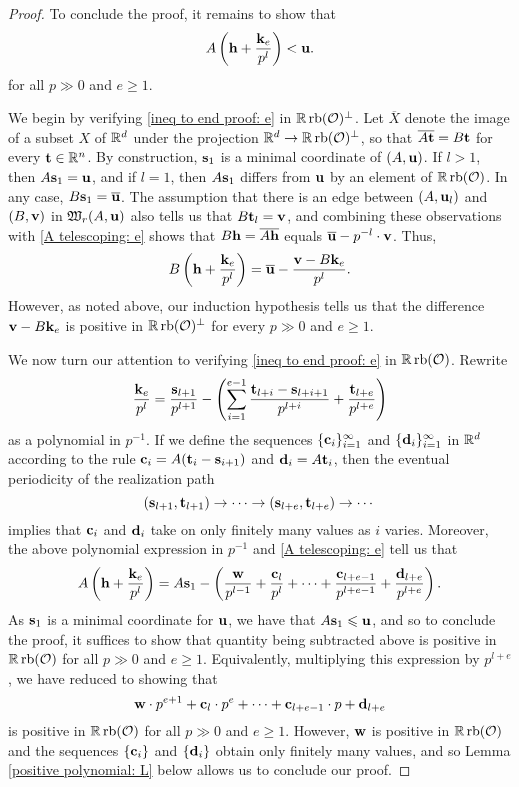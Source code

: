 \documentclass[11pt]{amsart}
\renewcommand{\!}[1]{{\color{red}\text{$\star$\,}#1\,$\star$}}
\newcommand{\ol}[1]{\overline{#1}}
\begin{document}
\begin{proof}
To conclude the proof, it remains to show that 
%
\begin{equation} 
\label{ineq to end proof: e}
A \left( \mathbf{h} + \frac{\mathbf{k}_e}{p^l} \right) < \mathbf{u}. 
\end{equation}
%
for all $p \gg 0$ and $e \geq 1$.

We begin by verifying \eqref{ineq to end proof: e} in $\mathbb{R} \operatorname{rb}(\mathcal{O})^{\perp}$.  Let $\ol{X}$ denote the image of a subset $X$ of $\mathbb{R}^d$ under the projection $\mathbb{R}^d \to \mathbb{R} \operatorname{rb}(\mathcal{O})^{\perp}$, so that $\ol{A \vv{t}} = B \vv{t}$ for every $\mathbf{t} \in \mathbb{R}^n$.    By construction, $\mathbf{s}_1$ is a minimal coordinate of $(A, \mathbf{u})$.  If $l > 1$, then $A \mathbf{s}_1 = \mathbf{u}$, and if $l =1$, then $A \mathbf{s}_1$ differs from $\mathbf{u}$ by an element of $\mathbb{R} \operatorname{rb}(\mathcal{O})$.  In any case, $B \vv{s}_1 = \ol{\vv{u}}$.   The assumption that there is an edge  between $(A, \mathbf{u}_l)$ and $(B, \mathbf{v})$ in $\mathfrak{W}_r(A, \mathbf{u})$ also tells us that $B \mathbf{t}_l = \mathbf{v}$, and combining these observations with \eqref{A telescoping: e} shows that
$B \vv{h} = \ol{A \vv{h}}$ equals $\ol{\vv{u}} - p^{-l} \cdot \vv{v}$.  Thus, 
\[  B \left( \vv{h} + \frac{\vv{k}_e}{p^l} \right) = \ol{\vv{u}} -  \frac{\vv{v} - B \vv{k}_e}{p^l}. \]
However, as noted above, our induction hypothesis tells us that the difference  $\mathbf{v} - B \mathbf{k}_e$ is positive in $\mathbb{R} \operatorname{rb}(\mathcal{O})^{\perp}$ for every $p \gg 0$ and $e \geq 1$.    

We now turn our attention to verifying \eqref{ineq to end proof: e} in $\mathbb{R} \operatorname{rb}(\mathcal{O})$.   Rewrite
\[ \frac{\mathbf{k}_e}{p^l} = \frac{\mathbf{s}_{l+1}}{p^{l+1}}- \left ( \sum_{i=1}^{e-1} \frac{ \mathbf{t}_{l+i} - \mathbf{s}_{l+i+1}}{p^{l+i}}  + \frac{ \mathbf{t}_{l+e}}{p^{l+e}} \right) \] as a polynomial in $p^{-1}$.  If we define the sequences $\{ \mathbf{c}_i \}_{i=1}^{\infty}$ and $\{ \mathbf{d}_i \}_{i=1}^{\infty}$ in $\mathbb{R}^d$ according to the rule $\mathbf{c}_i = A ( \mathbf{t}_i - \mathbf{s}_{i+1})$ and $\mathbf{d}_i = A \mathbf{t}_i$, then the eventual periodicity of the realization path 
\[ (\mathbf{s}_{l+1}, \mathbf{t}_{l+1}) \to \cdots \to (\mathbf{s}_{l+e}, \mathbf{t}_{l+e}) \to \cdots \] implies that $\mathbf{c}_i$ and $\mathbf{d}_i$ take on only finitely many values as $i$ varies.    Moreover, the above polynomial expression in $p^{-1}$ and \eqref{A telescoping: e} tell us that 
%
\[ A \left( \mathbf{h} + \frac{\mathbf{k}_e}{p^l} \right)  =  A \mathbf{s}_1 - \left( \frac{\mathbf{w}}{p^{l-1}} + \frac{ \mathbf{c}_{l}}{p^{l}} + \cdots +  \frac{ \mathbf{c}_{l+e-1}}{p^{l+e-1}} + \frac{\mathbf{d}_{l+e}}{p^{l+e}} \right).  \] 
%
As $\mathbf{s}_1$ is a minimal coordinate for $\mathbf{u}$, we have that $A \mathbf{s}_1 \leqslant \mathbf{u}$, and so to conclude the proof, it suffices to show that quantity being subtracted above is positive in $\mathbb{R} \operatorname{rb}(\mathcal{O})$ for all $p \gg 0$ and $e \geq 1$.  Equivalently, multiplying this expression by $p^{l+e}$, we have reduced to showing that 
\[ \mathbf{w} \cdot p^{e+1} + \mathbf{c}_l \cdot p^{e} + \cdots + \mathbf{c}_{l+e-1} \cdot p + \mathbf{d}_{l+e} \] is positive in $\mathbb{R} \operatorname{rb}(\mathcal{O})$ for all $p \gg 0$ and $e \geq 1$.  However, $\mathbf{w}$ is positive in $\mathbb{R} \operatorname{rb}(\mathcal{O})$ and the sequences $\{ \mathbf{c}_i \}$ and $\{ \mathbf{d}_i \}$ obtain only finitely many values, and so Lemma \ref{positive polynomial: L} below allows us to conclude our proof.

\end{proof}
\end{document}
